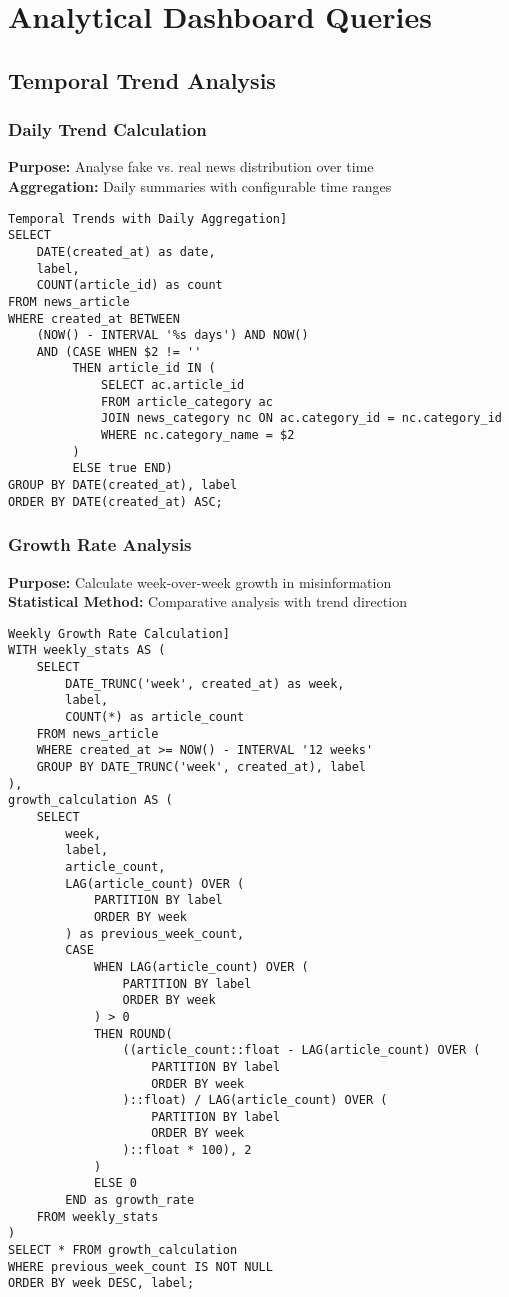 \documentclass[11pt,a4paper]{article}
\begin{document}
\section{Analytical Dashboard Queries}

\subsection{Temporal Trend Analysis}

\subsubsection{Daily Trend Calculation}
\textbf{Purpose:} Analyse fake vs. real news distribution over time\\
\textbf{Aggregation:} Daily summaries with configurable time ranges

\begin{verbatim}Temporal Trends with Daily Aggregation]
SELECT 
    DATE(created_at) as date,
    label,
    COUNT(article_id) as count
FROM news_article
WHERE created_at BETWEEN 
    (NOW() - INTERVAL '%s days') AND NOW()
    AND (CASE WHEN $2 != '' 
         THEN article_id IN (
             SELECT ac.article_id 
             FROM article_category ac
             JOIN news_category nc ON ac.category_id = nc.category_id
             WHERE nc.category_name = $2
         ) 
         ELSE true END)
GROUP BY DATE(created_at), label
ORDER BY DATE(created_at) ASC;
\end{verbatim}

\subsubsection{Growth Rate Analysis}
\textbf{Purpose:} Calculate week-over-week growth in misinformation\\
\textbf{Statistical Method:} Comparative analysis with trend direction

\begin{verbatim}Weekly Growth Rate Calculation]
WITH weekly_stats AS (
    SELECT 
        DATE_TRUNC('week', created_at) as week,
        label,
        COUNT(*) as article_count
    FROM news_article
    WHERE created_at >= NOW() - INTERVAL '12 weeks'
    GROUP BY DATE_TRUNC('week', created_at), label
),
growth_calculation AS (
    SELECT 
        week,
        label,
        article_count,
        LAG(article_count) OVER (
            PARTITION BY label 
            ORDER BY week
        ) as previous_week_count,
        CASE 
            WHEN LAG(article_count) OVER (
                PARTITION BY label 
                ORDER BY week
            ) > 0 
            THEN ROUND(
                ((article_count::float - LAG(article_count) OVER (
                    PARTITION BY label 
                    ORDER BY week
                )::float) / LAG(article_count) OVER (
                    PARTITION BY label 
                    ORDER BY week
                )::float * 100), 2
            )
            ELSE 0 
        END as growth_rate
    FROM weekly_stats
)
SELECT * FROM growth_calculation 
WHERE previous_week_count IS NOT NULL
ORDER BY week DESC, label;
\end{verbatim}
\end{document}
